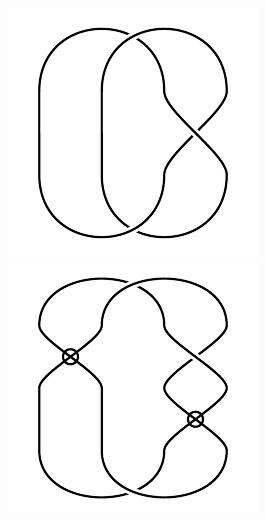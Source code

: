 \begin{figure}[H]
\begin{minipage}[b]{.18\linewidth}
\end{minipage}
\begin{minipage}[b]{.18\linewidth}
\centering
\includegraphics[width=\linewidth]{../data/virtual_3_6.png}
\end{minipage}
\begin{minipage}[b]{.18\linewidth}
\centering
\includegraphics[width=\linewidth]{../data/virtual_3_7.png}

\end{minipage}
\end{figure}
